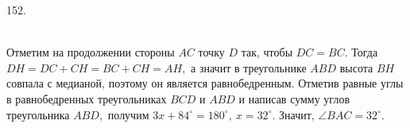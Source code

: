 152. \begin{figure}[ht!]
\end{figure}\\
Отметим на продолжении стороны $AC$ точку $D$ так, чтобы $DC=BC.$ Тогда $DH=DC+CH=BC+CH=AH,$ а значит в треугольнике $ABD$ высота $BH$ совпала с медианой, поэтому он является равнобедренным. Отметив равные углы в равнобедренных треугольниках $BCD$ и $ABD$ и написав сумму углов треугольника $ABD,$ получим $3x+84^\circ=180^\circ,\ x=32^\circ.$ Значит, $\angle BAC=32^\circ.$\\
